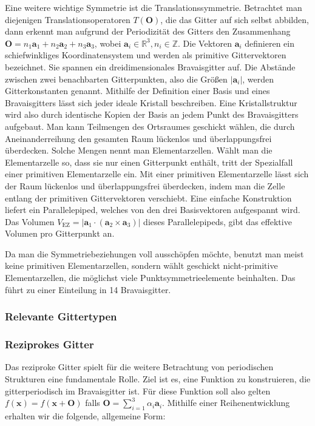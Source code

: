 Eine weitere wichtige Symmetrie ist die Translationssymmetrie.
Betrachtet man diejenigen Translationsoperatoren $T(\mathbf{O})$, die das Gitter auf sich selbst abbilden, dann erkennt
man aufgrund der Periodizität des Gitters den Zusammenhang
$\mathbf{O} = n_{1}\mathbf{a}_{1}+n_{2}\mathbf{a}_{2}+n_{3}\mathbf{a}_{3}$, wobei
$\mathbf{a}_{i}\in\mathbb{R}^{3}, n_{i}\in\mathbb{Z}$. \autocite[50]{Hunklinger}
Die Vektoren $\mathbf{a}_{i}$
definieren ein schiefwinkliges Koordinatensystem und werden als primitive Gittervektoren bezeichnet.
Sie spannen ein dreidimensionales Bravaisgitter auf.
Die Abstände zwischen zwei benachbarten Gitterpunkten, also die Größen
$\lvert \mathbf{a}_{i} \rvert$, werden Gitterkonstanten genannt. \autocite[82]{Ashcroft}
Mithilfe der Definition einer Basis und eines Bravaisgitters lässt sich jeder ideale Kristall beschreiben.
Eine Kristallstruktur wird also durch identische Kopien der Basis an jedem Punkt des Bravaisgitters aufgebaut.
\autocite[94-95]{Ashcroft}
Man kann Teilmengen des Ortsraumes geschickt wählen, die durch Aneinanderreihung den gesamten Raum lückenlos und
überlappungsfrei überdecken.
Solche Mengen nennt man Elementarzellen.
Wählt man die Elementarzelle so, dass sie nur einen Gitterpunkt enthält, tritt der Spezialfall einer primitiven
Elementarzelle ein.
Mit einer primitiven Elementarzelle lässt sich der Raum lückenlos und überlappungsfrei überdecken, indem man die Zelle
entlang der primitiven Gittervektoren verschiebt.
Eine einfache Konstruktion liefert ein Parallelepiped, welches von den drei Basisvektoren aufgespannt wird.
Das Volumen $V_\mathrm{EZ}= \lvert \mathbf{a}_1 \cdot (\mathbf{a}_2 \times  \mathbf{a}_3) \rvert$ dieses
Parallelepipeds, gibt das effektive Volumen pro Gitterpunkt an.
\autocite[90-91]{Ashcroft}


Da man die Symmetriebeziehungen voll ausschöpfen möchte, benutzt man meist keine primitiven Elementarzellen, sondern
wählt geschickt nicht-primitive Elementarzellen, die möglichst viele Punktsymmetrieelemente beinhalten.
Das führt zu einer Einteilung in 14 Bravaisgitter. \autocite[51]{Hunklinger}

\subsubsection{Relevante Gittertypen}
\subsubsection{Reziprokes Gitter}
Das reziproke Gitter spielt für die weitere Betrachtung von periodischen Strukturen eine fundamentale Rolle.
Ziel ist es, eine Funktion zu konstruieren, die gitterperiodisch im Bravaisgitter ist.
Für diese Funktion soll also gelten
$f(\mathbf{x})=f(\mathbf{x}+\mathbf{O})$ falls $\mathbf{O}=\sum_{i=1}^{3} \alpha_{i}\mathbf{a}_{i}$.
Mithilfe einer Reihenentwicklung erhalten wir die folgende, allgemeine Form:

